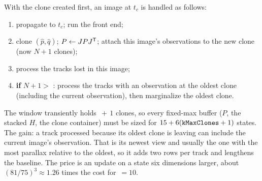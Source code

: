 \begin{solutions}
  \item With the clone created first, an image at $t_c$ is handled as follows:
        \begin{enumerate}[label=\arabic*:, leftmargin=2.2em, itemsep=0pt]
          \item propagate to $t_c$; run the front end;
          \item clone $(\hat p, \hat q)$; $P \gets JPJ^{\mathsf{T}}$; attach this image's observations to the new clone (now $N + 1$ clones);
          \item process the tracks lost in this image;
          \item \textbf{if} $N + 1 > $ : process the tracks with an observation at the oldest clone (including the current observation), then
                marginalize the oldest clone.
        \end{enumerate}
        The window transiently holds $\,+\,1$ clones, so every fixed-max buffer ($P$, the stacked $H$, the clone container) must be sized for
        $15 + 6(\text{{\upshape\ttfamily kMaxClones}} + 1)$ states. The gain: a track processed because its oldest clone is leaving can include the current image's observation. That is
        its newest view and usually the one with the most parallax relative to the oldest, so it adds two rows per track and lengthens the baseline. The price
        is an update on a state six dimensions larger, about $(81/75)^3 \approx 1.26$ times the cost for $\,= 10$.


\end{solutions}
